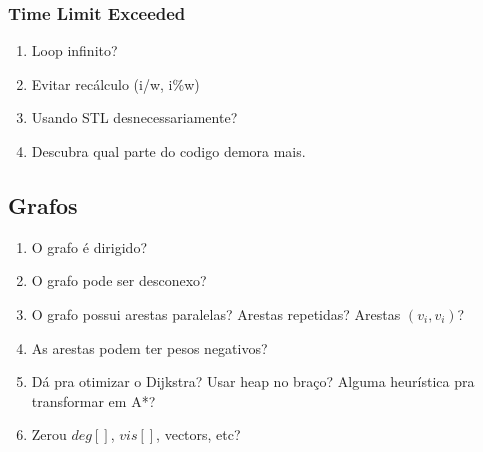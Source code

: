 \documentclass[12pt,a4paper]{article}
\begin{document}
			\subsubsection{Time Limit Exceeded}
				\begin{enumerate}
					\item Loop infinito?
					\item Evitar recálculo (i/w, i\%w)
					\item Usando STL desnecessariamente?
					\item Descubra qual parte do codigo demora mais.
				\end{enumerate}
		\subsection{Grafos}
			\begin{enumerate}
				\item O grafo é dirigido?
				\item O grafo pode ser desconexo?
				\item O grafo possui arestas paralelas? Arestas repetidas? Arestas $(v_i,v_i)$?
				\item As arestas podem ter pesos negativos?
				\item Dá pra otimizar o Dijkstra? Usar heap no braço? Alguma heurística pra transformar em A*?
				\item Zerou $deg[]$, $vis[]$, vectors, etc?
			\end{enumerate}
\end{document}
